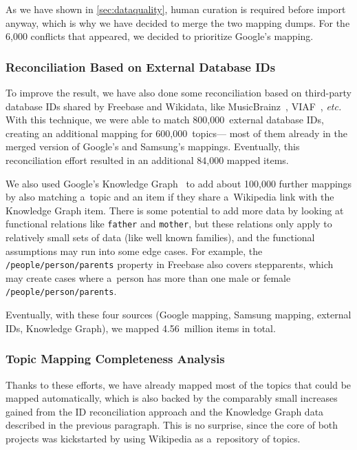 \documentclass{sig-alternate-2013}
\begin{document}
As we have shown in \autoref{sec:dataquality},
human curation is required before import anyway,
which is why we have decided to merge the two mapping dumps.
For the 6,000 conflicts that appeared, we decided to prioritize Google's mapping.

\subsubsection{Reconciliation Based on External Database IDs}

To improve the result, we have also done some reconciliation based on third-party database IDs
shared by Freebase and Wikidata, like MusicBrainz~\cite{musicbrainz},
VIAF~\cite{viaf}, \emph{etc.}
With this technique, we were able to match 800,000~external database IDs,
creating an additional mapping for 600,000~to\-pics---%
most of them already in the merged version of Google's and Samsung's mappings.
Eventually, this reconciliation effort resulted in an additional 84,000 mapped items.

We also used Google's Knowledge Graph~\cite{singhal2012} to add about 100,000 further mappings
by also matching a~topic and an item if they share a~Wikipedia link with the Knowledge Graph item.
There is some potential to add more data by looking at functional relations
like \texttt{father} and \texttt{mother},
but these relations only apply to relatively small sets of data
(like well known families), and the functional assumptions may run into some edge cases.
For example, the \texttt{/people/person/parents} property in Freebase also covers stepparents,
which may create cases where a~person has more than one male or female \texttt{/people/person/parents}.

Eventually, with these four sources (Google mapping, Samsung mapping, external IDs, Knowledge Graph),
we mapped 4.56~million items in total.

\subsubsection{Topic Mapping Completeness Analysis}

Thanks to these efforts, we have already mapped most of the topics that could be mapped automatically,
which is also backed by the comparably small increases gained from the ID reconciliation approach
and the Knowledge Graph data described in the previous paragraph.
This is no surprise, since the core of both projects was kickstarted by using
Wikipedia as a~repository of topics.
\end{document}
